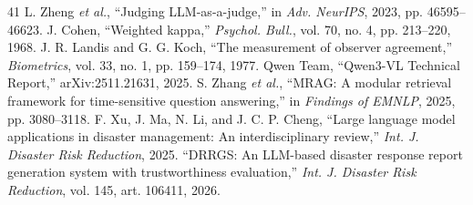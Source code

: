 \documentclass[conference]{IEEEtran}
\begin{document}
\begin{thebibliography}{41}
 L. Zheng \textit{et al.}, ``Judging LLM-as-a-judge,'' in \textit{Adv. NeurIPS}, 2023, pp. 46595--46623.
 J. Cohen, ``Weighted kappa,'' \textit{Psychol. Bull.}, vol. 70, no. 4, pp. 213--220, 1968.
 J. R. Landis and G. G. Koch, ``The measurement of observer agreement,'' \textit{Biometrics}, vol. 33, no. 1, pp. 159--174, 1977.
 Qwen Team, ``Qwen3-VL Technical Report,'' arXiv:2511.21631, 2025.
 S. Zhang \textit{et al.}, ``MRAG: A modular retrieval framework for time-sensitive question answering,'' in \textit{Findings of EMNLP}, 2025, pp. 3080--3118.
 F. Xu, J. Ma, N. Li, and J. C. P. Cheng, ``Large language model applications in disaster management: An interdisciplinary review,'' \textit{Int. J. Disaster Risk Reduction}, 2025.
 ``DRRGS: An LLM-based disaster response report generation system with trustworthiness evaluation,'' \textit{Int. J. Disaster Risk Reduction}, vol. 145, art. 106411, 2026.
\end{thebibliography}
\end{document}
